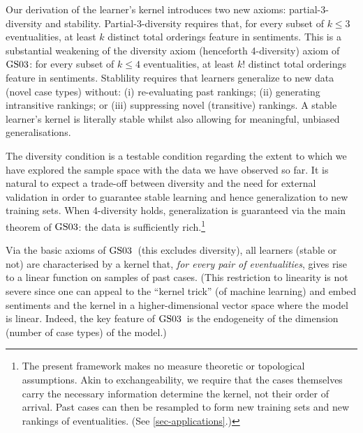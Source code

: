 \documentclass[ecta,nameyear,draft]{econsocart}
\newcommand{\gsii}{$\textup{GS03}$}
\theoremstyle{plain}
\theoremstyle{remark}
\begin{document}
Our derivation of the learner's kernel introduces two new axioms:
partial-3-diversity and stability. Partial-3-diversity requires that, for every
subset of $k \leq 3$ eventualities, at least $k$ distinct total orderings
feature in {sentiments}. This is a substantial weakening of the diversity axiom
(henceforth 4-diversity) axiom of \gsii: for every subset of $k \leq 4$
eventualities, at least $k!$ distinct total orderings feature in sentiments.
Stablility requires that learners generalize to new data (novel case types)
without: (i) re-evaluating past rankings; (ii) generating intransitive
rankings; or (iii) suppressing novel (transitive) rankings. A stable learner's
kernel is literally stable whilst also allowing for meaningful, unbiased
generalisations.

The diversity condition is a testable condition regarding the extent to which
we have explored the sample space with the data we have observed so far. It is
natural to expect a trade-off between diversity and the need for external
validation in order to guarantee stable learning and hence generalization to
new training sets. When 4-diversity holds, generalization is guaranteed via the
main theorem of \gsii: the data is sufficiently rich.\footnote{The present
  framework makes no measure theoretic or topological assumptions. Akin to
  exchangeability, we require that the cases themselves carry the
  necessary information determine the kernel, not their order of arrival. Past
  cases can then be resampled to form new training sets and new rankings of
eventualities. (See \cref{sec-applications}.)}

Via the basic axioms of \gsii\ (this excludes diversity), all learners (stable
or not) are characterised by a kernel that, \emph{for every pair of
eventualities}, gives rise to a linear function on samples of past cases. (This
restriction to linearity is not severe since one can appeal to the ``kernel
trick'' (of machine learning) and embed sentiments and the kernel in a
higher-dimensional vector space where the model is linear. Indeed, the key
feature of \gsii\ is the endogeneity of the dimension (number of case types) of
the model.)
\end{document}
